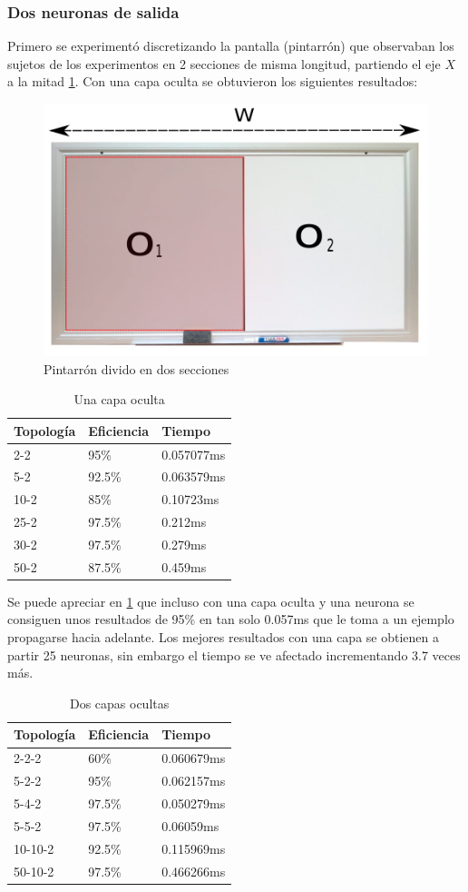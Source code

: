 \subsubsection{Dos neuronas de salida}
Primero se experimentó discretizando la pantalla (pintarrón) que observaban los sujetos de los experimentos en 2 secciones de misma longitud, partiendo el eje $X$ a la mitad \ref{fig: pint1}. Con una capa oculta se obtuvieron los siguientes resultados:
\begin{figure}[htbp] 
	\centering
	\includegraphics[width=.3\textwidth]{./pictures/pint1}
	\caption{Pintarrón divido en dos secciones}\label{fig: pint1}
\end{figure}
\begin{table}[]
	\centering
	\caption{Una capa oculta}
	\label{my-label}
	\begin{tabular}{|l|l|l|}
		\hline
		Topología & Eficiencia & Tiempo     \\ \hline
		2-2       & 95\%       & 0.057077ms \\ \hline
		5-2       & 92.5\%     & 0.063579ms \\ \hline
		10-2      & 85\%       & 0.10723ms    \\ \hline
		25-2      & 97.5\%     & 0.212ms    \\ \hline
		30-2      & 97.5\%     & 0.279ms    \\ \hline
		50-2      & 87.5\%     & 0.459ms    \\ \hline
	\end{tabular}\label{tab:unaCapa2}
\end{table}
Se puede apreciar en \ref{tab:unaCapa2} que incluso con una capa oculta y una neurona se consiguen unos resultados de 95\% en tan solo 0.057ms que le toma a un ejemplo propagarse hacia adelante. Los mejores resultados con una capa se obtienen a partir 25 neuronas, sin embargo el tiempo se ve afectado incrementando 3.7 veces más.
\begin{table}[]
	\centering
	\caption{Dos capas ocultas}
	\label{my-label}
	\begin{tabular}{|l|l|l|}
		\hline
		Topología & Eficiencia & Tiempo     \\ \hline
		2-2-2     & 60\%       & 0.060679ms \\ \hline
		5-2-2     & 95\%       & 0.062157ms \\ \hline
		5-4-2     & 97.5\%     & 0.050279ms \\ \hline
		5-5-2     & 97.5\%     & 0.06059ms  \\ \hline
		10-10-2   & 92.5\%     & 0.115969ms \\ \hline
		50-10-2   & 97.5\%     & 0.466266ms \\ \hline
	\end{tabular}\label{tab: dosCapas2}
\end{table}
